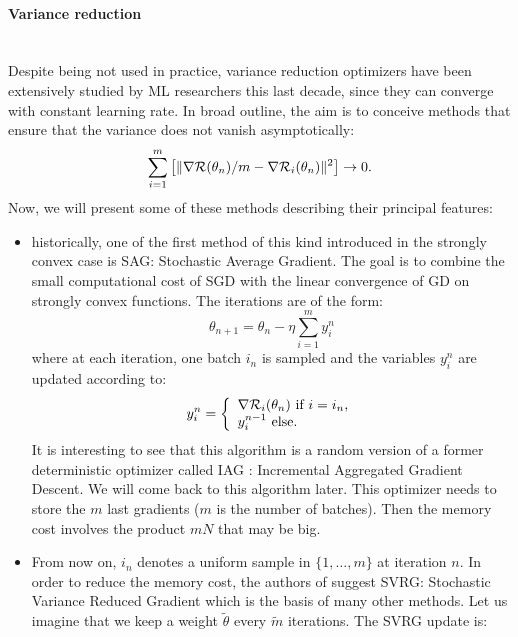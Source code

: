 \paragraph{Variance reduction}  
~~\\
Despite being not used in practice, variance reduction optimizers have been extensively studied by ML researchers this last decade, since they can converge with constant learning rate. In broad outline, the aim is to conceive methods that ensure that the variance does not vanish asymptotically:
\begin{equation*}
	\displaystyle{\sum_{i=1}^m}\left[\|\nabla \mathcal{R}(\theta_n)/m-\nabla \mathcal{R}_i(\theta_n)\|^2\right] \to 0.
\end{equation*}
Now, we will present some of these methods describing their principal features:
\begin{itemize}
	\item historically, one of the first method of this kind introduced in the strongly convex case is SAG: Stochastic Average Gradient. The goal is to combine the small computational cost of SGD with the linear convergence of GD on strongly convex functions. The iterations are of the form:
	\begin{equation*}
		\theta_{n+1}=\theta_n-\eta \sum_{i=1}^m y_i^n
	\end{equation*}
	where at each iteration, one batch $i_n$ is sampled and the variables $y_i^n$ are updated according to:
	\begin{equation*}
		y_i^n =
		\left\{
		\begin{array}{ll}
			\nabla \mathcal{R}_i(\theta_n) \text{ if } i=i_n, \\
			y_i^{n-1} \text{ else}.
		\end{array}
		\right.
	\end{equation*}
It is interesting to see that this algorithm is a random version of a former deterministic optimizer called IAG \cite{IAG_first}: Incremental Aggregated Gradient Descent. We will come back to this algorithm later. This optimizer needs to store the $m$ last gradients ($m$ is the number of batches). Then the memory cost involves the product $mN$ that may be big.
\item From now on, $i_n$ denotes a uniform sample in $\{1,\dots,m\}$ at iteration $n$. In order to reduce the memory cost, the authors of \cite{SVRG_first} suggest SVRG: Stochastic Variance Reduced Gradient which is the basis of many other methods. Let us imagine that we keep a weight $\tilde{\theta}$ every $\tilde{m}$ iterations. The SVRG update is:
\begin{equation*}

\end{equation*}
\end{itemize}
